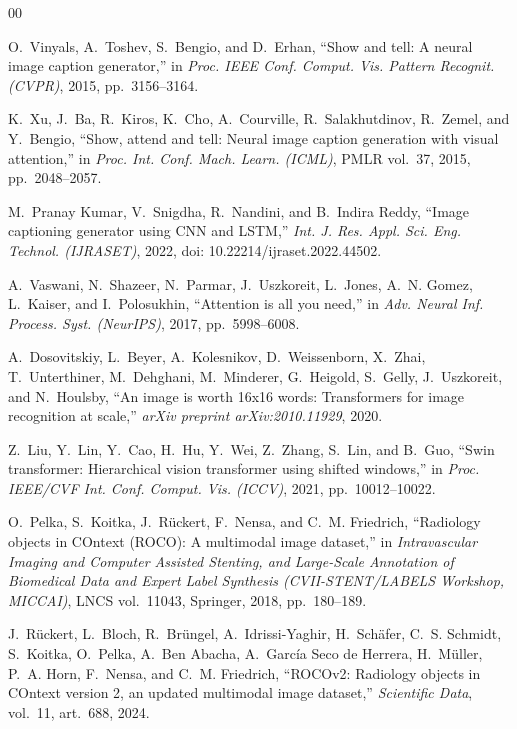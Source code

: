 \documentclass[conference]{IEEEtran}
\begin{document}
\begin{thebibliography}{00}

O.~Vinyals, A.~Toshev, S.~Bengio, and D.~Erhan, ``Show and tell: A neural image caption generator,'' in \emph{Proc. IEEE Conf. Comput. Vis. Pattern Recognit. (CVPR)}, 2015, pp.~3156--3164.

K.~Xu, J.~Ba, R.~Kiros, K.~Cho, A.~Courville, R.~Salakhutdinov, R.~Zemel, and Y.~Bengio, ``Show, attend and tell: Neural image caption generation with visual attention,'' in \emph{Proc. Int. Conf. Mach. Learn. (ICML)}, PMLR vol.~37, 2015, pp.~2048--2057.

M.~Pranay Kumar, V.~Snigdha, R.~Nandini, and B.~Indira Reddy, ``Image captioning generator using CNN and LSTM,'' \emph{Int. J. Res. Appl. Sci. Eng. Technol. (IJRASET)}, 2022, doi: 10.22214/ijraset.2022.44502.

A.~Vaswani, N.~Shazeer, N.~Parmar, J.~Uszkoreit, L.~Jones, A.~N. Gomez, L.~Kaiser, and I.~Polosukhin, ``Attention is all you need,'' in \emph{Adv. Neural Inf. Process. Syst. (NeurIPS)}, 2017, pp.~5998--6008.

A.~Dosovitskiy, L.~Beyer, A.~Kolesnikov, D.~Weissenborn, X.~Zhai, T.~Unterthiner, M.~Dehghani, M.~Minderer, G.~Heigold, S.~Gelly, J.~Uszkoreit, and N.~Houlsby, ``An image is worth 16x16 words: Transformers for image recognition at scale,'' \emph{arXiv preprint arXiv:2010.11929}, 2020.

Z.~Liu, Y.~Lin, Y.~Cao, H.~Hu, Y.~Wei, Z.~Zhang, S.~Lin, and B.~Guo, ``Swin transformer: Hierarchical vision transformer using shifted windows,'' in \emph{Proc. IEEE/CVF Int. Conf. Comput. Vis. (ICCV)}, 2021, pp.~10012--10022.

O.~Pelka, S.~Koitka, J.~Rückert, F.~Nensa, and C.~M. Friedrich, ``Radiology objects in COntext (ROCO): A multimodal image dataset,'' in \emph{Intravascular Imaging and Computer Assisted Stenting, and Large-Scale Annotation of Biomedical Data and Expert Label Synthesis (CVII-STENT/LABELS Workshop, MICCAI)}, LNCS vol.~11043, Springer, 2018, pp.~180--189.

J.~Rückert, L.~Bloch, R.~Brüngel, A.~Idrissi-Yaghir, H.~Schäfer, C.~S. Schmidt, S.~Koitka, O.~Pelka, A.~Ben Abacha, A.~García Seco de Herrera, H.~Müller, P.~A. Horn, F.~Nensa, and C.~M. Friedrich, ``ROCOv2: Radiology objects in COntext version 2, an updated multimodal image dataset,'' \emph{Scientific Data}, vol.~11, art.~688, 2024.


\end{thebibliography}
\end{document}
